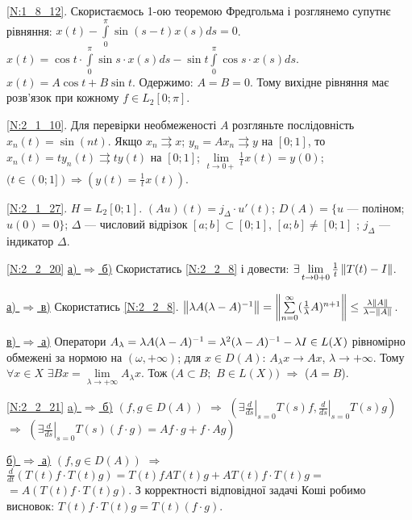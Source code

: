 \noindent\ref{N:1_8_12}. Скористаємось 1-ою теоремою Фредгольма і розглянемо супутнє рівняння: $x(t) - \int\limits_0^{\pi} \sin (s-t)x(s) ds = 0$.
$x(t) = \cos t \cdot \int\limits_0^{\pi} \sin s \cdot x(s) ds - \sin t \int\limits_0^{\pi} \cos s \cdot x(s) ds$. $x(t) = A \cos t + B \sin t$.
Одержимо: $A = B = 0$. Тому вихідне рівняння має розв'язок при кожному $f \in L_2 [0; \pi]$.

\noindent\ref{N:2_1_10}. Для перевірки необмеженості $A$ розгляньте послідовність $x_n (t) = \sin (nt)$.
Якщо $x_n \rightrightarrows x$; $y_n = A x_n \rightrightarrows y$ на $[0; 1]$, то $x_n (t) = t y_n(t) \rightrightarrows t y(t)$
на $[0; 1]$; $\lim\limits_{t \rightarrow 0+} \frac{1}{t} x(t) = y(0)$; $(t \in (0; 1]) \Rightarrow (y(t) = \frac{1}{t} x(t))$.

\noindent\ref{N:2_1_27}. $H = L_2 [0; 1]$. $(A u)(t) = j_{\Delta} \cdot u'(t)$; 
$D(A) = \{u$ --- поліном; $u(0) = 0\}$; $\Delta$ --- числовий відрізок $[a; b] \subset [0; 1]$, $[a; b] \neq [0; 1]$ ; $j_{\Delta}$ --- індикатор $\Delta$.

\noindent\ref{N:2_2_20} \ul{а) $\Rightarrow$ б)} Скористатись \ref{N:2_2_8} і 
довести: $\exists \lim\limits_{t\rightarrow 0+0}\frac{1}{t}\left\lVert T(t) - I\right\rVert$.

\noindent \ul{а) $\Rightarrow$ в)} Скористатись \ref{N:2_2_8}. 
$\left\lVert\lambda A (\lambda - A)^{-1}\right\rVert = \left\lVert\sum\limits_{n=0}^\infty 
(\frac{1}{\lambda}A)^{n+1}\right\rVert \leq \frac{\lambda \left\lVert A\right\rVert}{\lambda - \left\lVert A\right\rVert}$.

\noindent \ul{в) $\Rightarrow$ а)} Оператори $A_\lambda = \lambda A (\lambda - A)^{-1} = 
\lambda^2 (\lambda - A)^{-1} - \lambda I \in L(X)$ рівномірно обмежені за 
нормою на $(\omega, +\infty)$; для $x \in D(A)$: $A_\lambda x \rightarrow 
Ax$, $\lambda \rightarrow +\infty$. Тому $\forall x \in X$ $\exists Bx 
= \lim\limits_{\lambda \rightarrow +\infty} A_\lambda x$. 
Тож $(A \subset B;$ $B \in L(X))$ $\Rightarrow$ ($A = B$).

\noindent\ref{N:2_2_21} \ul{a) $\Rightarrow$ б)} $\left(f, g \in D(A)\right)$ 
$\Rightarrow$ $\left(\exists \left.\frac{d}{ds}\right|_{s=0}T(s)f, 
\left.\frac{d}{ds}\right|_{s=0}T(s)g\right)$ $\Rightarrow$ 
$(\exists \left.\frac{d}{ds}\right|_{s=0}T(s)(f\cdot g) = Af \cdot g + f \cdot Ag)$

\ul{б) $\Rightarrow$ а)} $(f, g\in D(A))$ $\Rightarrow$ $\frac{d}{dt}(T(t)f \cdot T(t)g) = 
T(t)f AT(t)g + AT(t)f\cdot T(t)g =$ $=A(T(t)f\cdot T(t)g)$.
З корректності відповідної задачі Коші робимо висновок:
$T(t)f \cdot T(t)g = T(t)(f \cdot g)$.

